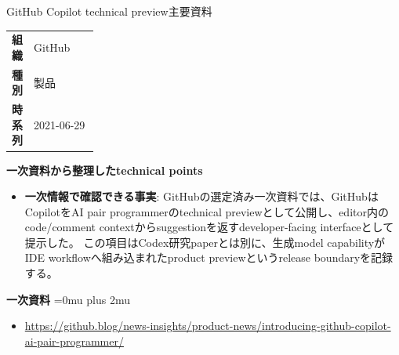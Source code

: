\begin{technicalnote}{GitHub Copilot technical preview}{主要資料}
\begingroup
\begin{tabularx}{\linewidth}{@{}>{\bfseries}p{0.22\linewidth}X@{}}
組織 & GitHub \\
種別 & 製品 \\
時系列 & 2021-06-29 \\
\end{tabularx}
\smallskip
{\bfseries 一次資料から整理したtechnical points}
\begin{itemize}[leftmargin=1.5em,itemsep=0.35em]
\item \textbf{一次情報で確認できる事実}: GitHubの選定済み一次資料では、GitHubはCopilotをAI pair programmerのtechnical previewとして公開し、editor内のcode/comment contextからsuggestionを返すdeveloper-facing interfaceとして提示した。 この項目はCodex研究paperとは別に、生成model capabilityがIDE workflowへ組み込まれたproduct previewというrelease boundaryを記録する。
\end{itemize}
\begin{minipage}{\linewidth}
\begin{samepage}
{\bfseries 一次資料}
\begingroup\sloppy
\Urlmuskip=0mu plus 2mu\relax
\begin{itemize}[leftmargin=1.5em,itemsep=0.25em]
\item {\scriptsize\url{https://github.blog/news-insights/product-news/introducing-github-copilot-ai-pair-programmer/}}
\end{itemize}
\endgroup
\end{samepage}
\end{minipage}
\endgroup
\end{technicalnote}
\medskip
